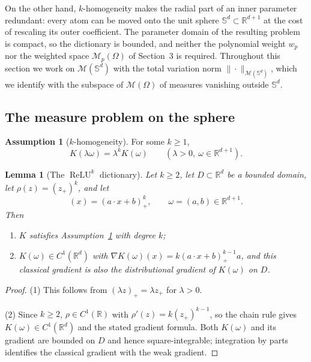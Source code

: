 \documentclass[11pt]{amsart}
\newtheorem{lemma}[theorem]{Lemma}
\theoremstyle{definition}
\newtheorem{assumption}[theorem]{Assumption}
\theoremstyle{remark}
\DeclareMathOperator{\relu}{ReLU}
\newcommand{\reluk}{\relu^{k}}
\begin{document}
On the other hand, $k$-homogeneity makes the radial part of an inner
parameter redundant: every atom can be moved onto the unit sphere
$\mathbb S^d\subset\mathbb R^{d+1}$ at the cost of rescaling its outer
coefficient. The parameter domain of the resulting problem is compact, so the
dictionary is bounded, and neither the polynomial weight $w_p$ nor the
weighted space $\mathcal M_p(\Omega)$ of Section~3 is required. Throughout
this section we work on $\mathcal M(\mathbb S^d)$ with the total variation norm $\|\cdot\|_{\mathcal M(\mathbb S^d)}$, which we identify with the
subspace of $\mathcal M(\Omega)$ of measures vanishing outside
$\mathbb S^d$.


\subsection{The measure problem on the sphere}
\begin{assumption}[$k$-homogeneity]
\label{ass:k-homogeneous}
For some $k\ge1$,
\begin{equation*}
	K(\lambda\omega)=\lambda^k K(\omega)
	\qquad(\lambda>0,\ \omega\in\mathbb R^{d+1}).
\end{equation*}
\end{assumption}

\begin{lemma}[The $\reluk$ dictionary]
\label{lem:reluk-dictionary}
Let $k\ge2$, let $D\subset\mathbb R^d$ be a bounded domain, let
$\rho(z)=(z_+)^k$, and let
\begin{equation*}
	[K(\omega)](x)=(a\cdot x+b)_+^k,
	\qquad \omega=(a,b)\in\mathbb R^{d+1}.
\end{equation*}
Then
\begin{enumerate}
	\item $K$ satisfies Assumption~\ref{ass:k-homogeneous} with degree $k$;
	\item $K(\omega)\in C^1(\mathbb R^d)$ with
	$\nabla K(\omega)(x)=k(a\cdot x+b)_+^{k-1}a$, and this classical gradient
	is also the distributional gradient of $K(\omega)$ on $D$.
\end{enumerate}
\end{lemma}
\begin{proof}
(1) This follows from $(\lambda z)_+=\lambda z_+$ for $\lambda>0$.

(2) Since $k\ge2$, $\rho\in C^1(\mathbb R)$ with
$\rho'(z)=k(z_+)^{k-1}$, so the chain rule gives
$K(\omega)\in C^1(\mathbb R^d)$ and the stated gradient formula.
Both $K(\omega)$ and its gradient are bounded on $D$ and hence
square-integrable; integration by parts identifies the classical gradient
with the weak gradient.
\end{proof}
\end{document}
